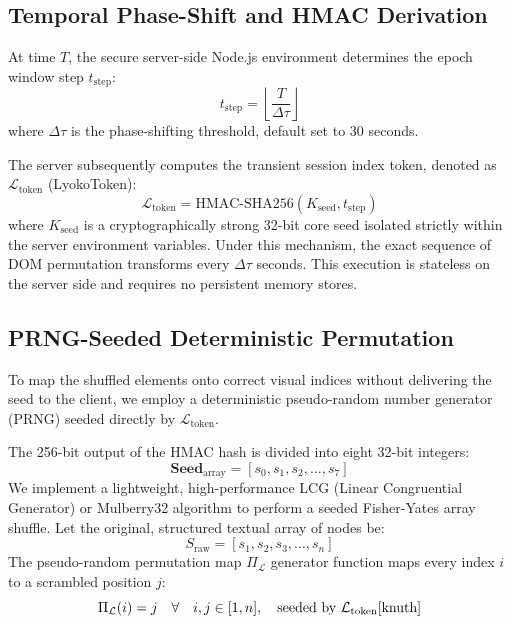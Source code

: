 \documentclass[10pt,journal,compsoc]{IEEEtran}
\begin{document}
\subsection{Temporal Phase-Shift and HMAC Derivation}
At time $T$, the secure server-side Node.js environment determines the epoch window step $t_{\text{step}}$:
\begin{equation}
    t_{\text{step}} = \left\lfloor \frac{T}{\Delta \tau} \right\rfloor
\end{equation}
where $\Delta \tau$ is the phase-shifting threshold, default set to $30$ seconds. 

The server subsequently computes the transient session index token, denoted as $\mathcal{L}_{\text{token}}$ (LyokoToken):
\begin{equation}
    \mathcal{L}_{\text{token}} = \text{HMAC-SHA256}(K_{\text{seed}}, t_{\text{step}})
\end{equation}
where $K_{\text{seed}}$ is a cryptographically strong 32-bit core seed isolated strictly within the server environment variables. Under this mechanism, the exact sequence of DOM permutation transforms every $\Delta \tau$ seconds. This execution is stateless on the server side and requires no persistent memory stores.

\subsection{PRNG-Seeded Deterministic Permutation}
To map the shuffled elements onto correct visual indices without delivering the seed to the client, we employ a deterministic pseudo-random number generator (PRNG) seeded directly by $\mathcal{L}_{\text{token}}$. 

The 256-bit output of the HMAC hash is divided into eight 32-bit integers:
\begin{equation}
    \mathbf{Seed}_{\text{array}} = [s_0, s_1, s_2, \dots, s_7]
\end{equation}
We implement a lightweight, high-performance LCG (Linear Congruential Generator) or Mulberry32 algorithm to perform a seeded Fisher-Yates array shuffle. Let the original, structured textual array of nodes be:
\begin{equation}
    S_{\text{raw}} = [s_1, s_2, s_3, \dots, s_n]
\end{equation}
The pseudo-random permutation map $\Pi_{\mathcal{L}}$ generator function maps every index $i$ to a scrambled position $j$:
\begin{equation}
    \Pi_{\mathcal{L}}(i) = j \quad \forall \quad i, j \in [1, n], \quad \text{seeded by } \mathcal{L}_{\text{token}} \cite{knuth}
\end{equation}
\end{document}
